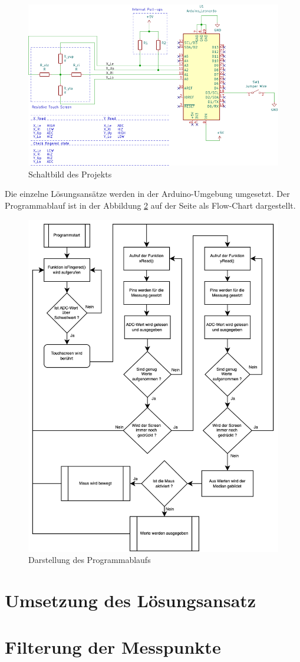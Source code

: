 \begin{figure}[ht!]
    \centering
    \includegraphics[width=\linewidth]{fig/schaltbild.png}
    \caption{Schaltbild des Projekts}
    \label{fig:schaltbild}
\end{figure}
Die einzelne Lösungsansätze werden in der Arduino-Umgebung umgesetzt. Der Programmablauf ist in der Abbildung \ref{fig:flowchart} auf der Seite \pageref{fig:flowchart} als Flow-Chart dargestellt.

\begin{figure}
    \centering
    \includegraphics[scale=0.45]{fig/flowChart.png}
    \caption{Darstellung des Programmablaufs}
    \label{fig:flowchart}
\end{figure}
\section{Umsetzung des Lösungsansatz}
\section{Filterung der Messpunkte}